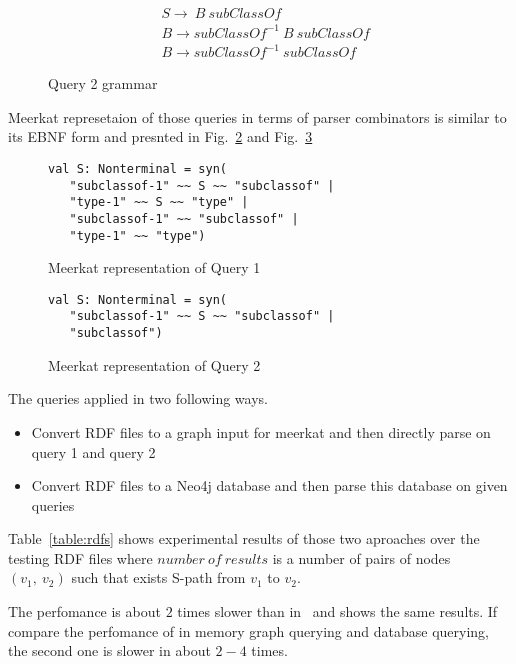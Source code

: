 \begin{figure}[h]
\begin{align*}
& S \rightarrow\ B\ subClassOf\\
& B \rightarrow subClassOf^{-1}\ B\ subClassOf\\
& B \rightarrow subClassOf^{-1}\ subClassOf
\end{align*}
\caption{Query 2 grammar}
\label{fig:query2}
\end{figure}

Meerkat represetaion of those queries in terms of parser combinators is similar to its EBNF form and presnted in Fig.~\ref{fig:query1Meerkat} and Fig.~\ref{fig:query2Meerkat}

\begin{figure}[h]
\begin{lstlisting}
val S: Nonterminal = syn(
   "subclassof-1" ~~ S ~~ "subclassof" |
   "type-1" ~~ S ~~ "type" |
   "subclassof-1" ~~ "subclassof" |
   "type-1" ~~ "type")
\end{lstlisting}
\caption{Meerkat representation of Query 1}
\label{fig:query1Meerkat}
\end{figure}

\begin{figure}[h]
\begin{lstlisting}
val S: Nonterminal = syn(
   "subclassof-1" ~~ S ~~ "subclassof" |
   "subclassof")
\end{lstlisting}
\caption{Meerkat representation of Query 2}
\label{fig:query2Meerkat}
\end{figure}

The queries applied in two following ways.
\begin{itemize}
    \item Convert RDF files to a graph input for meerkat and then directly parse on query 1 and query 2
    \item Convert RDF files to a Neo4j database and then parse this database on given queries
\end{itemize} 

Table~\ref{table:rdfs} shows experimental results of those two aproaches over the testing RDF files where $number\ of\ results$ is a number of pairs of nodes $(v_1,\ v_2)$ such that exists S-path from $v_1$ to $v_2$.

The perfomance is about $2$ times slower than in~\cite{GrigorevR16} and shows the same results.
If compare the perfomance of in memory graph querying and database querying, the second one is slower in about $2-4$ times.






